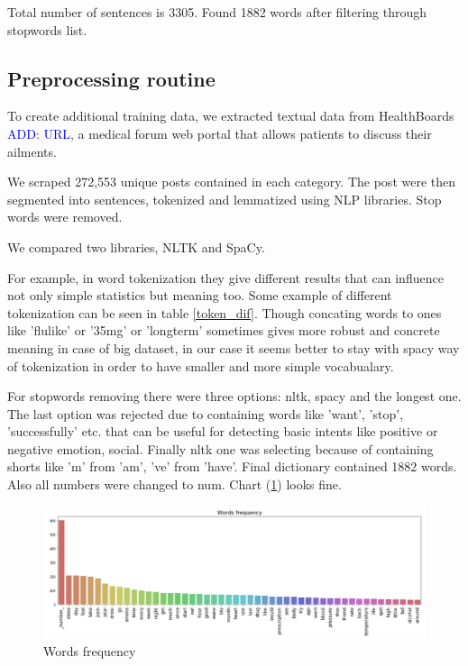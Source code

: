 \documentclass[11pt]{article}
\newcommand\add[1]{{\textcolor{blue}{ADD: #1}}}
\begin{document}
Total number of sentences is 3305. Found 1882 words after filtering through stopwords list. 

\subsection{Preprocessing routine}

To create additional training data, we extracted textual data from
HealthBoards \add{URL}, a medical forum web portal that allows
patients to discuss their ailments.

We scraped 272,553 unique posts contained in each category.  The post
were then segmented into sentences, tokenized and lemmatized using NLP
libraries. Stop words were removed.

We compared two libraries, NLTK and SpaCy.

For example, in word tokenization they give different results that can influence not only simple statistics but meaning too. Some example of different tokenization can be seen in table \ref{token_dif}. Though concating words to ones like 'flulike' or '35mg' or 'longterm' sometimes gives more robust and concrete meaning in case of big dataset, in our case it seems better to stay with spacy way of tokenization in order to have smaller and more simple vocabualary.

For stopwords removing there were three options: nltk, spacy and the longest one. The last option was rejected due to containing words like 'want', 'stop', 'successfully' etc. that can be useful for detecting basic intents like positive or negative emotion, social. Finally nltk one was selecting because of containing shorts like 'm' from 'am', 've' from 'have'. Final dictionary contained 1882 words. Also all numbers were changed to num. Chart (\ref{words_freq}) looks fine.

 \begin{figure}[h]
 	\centering
 	\includegraphics[scale=0.4]{report2.png}
	\caption{Words frequency}
 \label{words_freq}
 \end{figure}
\FloatBarrier
\end{document}
